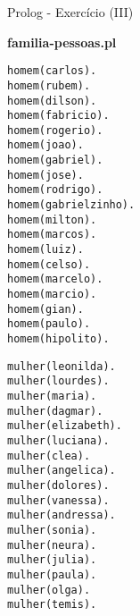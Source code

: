 \begin{frame}[fragile]{Prolog - Exercício (III)}
\begin{center}
{\bf familia-pessoas.pl}
\end{center}

\begin{minipage}{0.4\textwidth}
\begin{tiny}
\begin{lstlisting}
homem(carlos).
homem(rubem).
homem(dilson).
homem(fabricio).
homem(rogerio).
homem(joao).
homem(gabriel).
homem(jose).
homem(rodrigo).
homem(gabrielzinho).
homem(milton).
homem(marcos).
homem(luiz).
homem(celso).
homem(marcelo).
homem(marcio).
homem(gian).
homem(paulo).
homem(hipolito).
\end{lstlisting}
\end{tiny}
\end{minipage}
\begin{minipage}{0.4\textwidth}
\begin{tiny}
\begin{lstlisting}
mulher(leonilda).
mulher(lourdes).
mulher(maria).
mulher(dagmar).
mulher(elizabeth).
mulher(luciana).
mulher(clea).
mulher(angelica).
mulher(dolores).
mulher(vanessa).
mulher(andressa).
mulher(sonia).
mulher(neura).
mulher(julia).
mulher(paula).
mulher(olga).
mulher(temis).
\end{lstlisting}
\end{tiny}
\end{minipage}
\end{frame}

